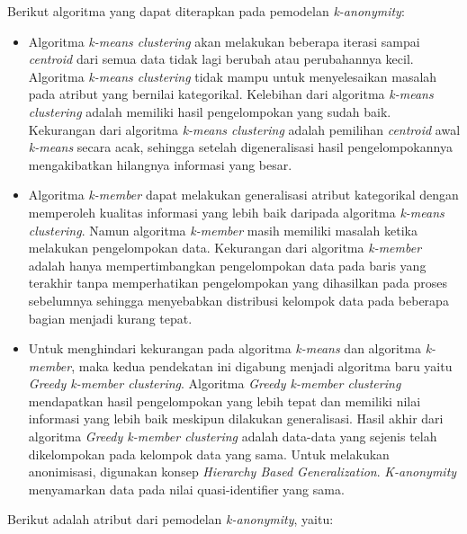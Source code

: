 \noindent Berikut algoritma yang dapat diterapkan pada pemodelan \textit{k-anonymity}:

\begin{itemize}

\item Algoritma \textit{k-means clustering} akan melakukan beberapa iterasi sampai \textit{centroid} dari semua data tidak lagi berubah atau perubahannya kecil. Algoritma \textit{k-means clustering} tidak mampu untuk menyelesaikan masalah pada atribut yang bernilai kategorikal. Kelebihan dari algoritma \textit{k-means clustering} adalah memiliki hasil pengelompokan yang sudah baik. Kekurangan dari algoritma \textit{k-means clustering} adalah pemilihan {\it centroid} awal {\it k-means} secara acak, sehingga setelah digeneralisasi hasil pengelompokannya mengakibatkan hilangnya informasi yang besar.

\item Algoritma \textit{k-member} dapat melakukan generalisasi atribut kategorikal dengan memperoleh kualitas informasi yang lebih baik daripada algoritma \textit{k-means clustering}. Namun algoritma \textit{k-member} masih memiliki masalah ketika melakukan pengelompokan data. Kekurangan dari algoritma \textit{k-member} adalah hanya mempertimbangkan pengelompokan data pada baris yang terakhir tanpa memperhatikan pengelompokan yang dihasilkan pada proses sebelumnya sehingga menyebabkan distribusi kelompok data pada beberapa bagian menjadi kurang tepat. 

\item Untuk menghindari kekurangan pada algoritma \textit{k-means} dan algoritma \textit{k-member}, maka kedua pendekatan ini digabung menjadi algoritma baru yaitu  \textit{Greedy k-member clustering}. Algoritma \textit{Greedy k-member clustering} mendapatkan hasil pengelompokan yang lebih tepat dan memiliki nilai informasi yang lebih baik meskipun dilakukan generalisasi. Hasil akhir dari algoritma \textit{Greedy k-member clustering} adalah data-data yang sejenis telah dikelompokan pada kelompok data yang sama. Untuk melakukan anonimisasi, digunakan konsep \textit{Hierarchy Based Generalization}. \textit{K-anonymity} menyamarkan data pada nilai quasi-identifier yang sama. 

\end{itemize}

\noindent Berikut adalah atribut dari pemodelan \textit{k-anonymity}, yaitu:
 
